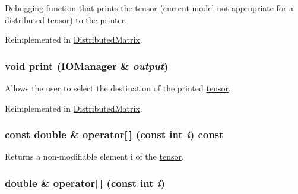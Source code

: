 Debugging function that prints the \hyperlink{classJKBuilder_1_1tensor}{tensor} (current model not appropriate for a distributed \hyperlink{classJKBuilder_1_1tensor}{tensor}) to the \hyperlink{classJKBuilder_1_1printer}{printer}. 

Reimplemented in \hyperlink{classJKBuilder_1_1DistributedMatrix_a388f572c62279f839ee138a9afbdeeb5}{DistributedMatrix}.\hypertarget{classJKBuilder_1_1tensor_a74b2fe351a5444c1325870dc6162f451}{
\subsubsection[{print}]{\setlength{\rightskip}{0pt plus 5cm}void print ({\bf IOManager} \& {\em output})}}
\label{classJKBuilder_1_1tensor_a74b2fe351a5444c1325870dc6162f451}


Allows the user to select the destination of the printed \hyperlink{classJKBuilder_1_1tensor}{tensor}. 

Reimplemented in \hyperlink{classJKBuilder_1_1DistributedMatrix_a74b2fe351a5444c1325870dc6162f451}{DistributedMatrix}.\hypertarget{classJKBuilder_1_1tensor_a4f0dc1b84b580cec49500c70f87e084a}{
\subsubsection[{operator[]}]{\setlength{\rightskip}{0pt plus 5cm}const double \& operator\mbox{[}$\,$\mbox{]} (const int {\em i}) const}}
\label{classJKBuilder_1_1tensor_a4f0dc1b84b580cec49500c70f87e084a}


Returns a non-\/modifiable element i of the \hyperlink{classJKBuilder_1_1tensor}{tensor}. \hypertarget{classJKBuilder_1_1tensor_a38c9fed6b117f7cf8b76785648d76b62}{
\subsubsection[{operator[]}]{\setlength{\rightskip}{0pt plus 5cm}double \& operator\mbox{[}$\,$\mbox{]} (const int {\em i})}}
\label{classJKBuilder_1_1tensor_a38c9fed6b117f7cf8b76785648d76b62}


